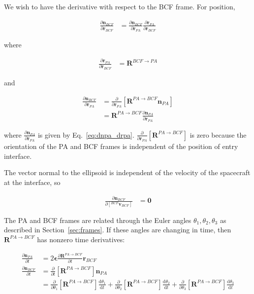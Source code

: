 \documentclass[]{article}
\newcommand{\vb}[1]{\bm{#1}} %
\newcommand{\ddt}[1]{\frac{\mathrm{d} #1}{\mathrm{d} t}} %
\newcommand{\pd}[2]{\frac{\partial #1}{\partial #2}} %
\begin{document}
We wish to have the derivative with respect to the BCF frame. For position,

\begin{align}
	\pd{\vb{n}_{BCF}}{\vb{r}_{BCF}} &= \pd{\vb{n}_{BCF}}{\vb{r}_{PA}} \pd{\vb{r}_{PA}}{\vb{r}_{BCF}}
\end{align}

where

\begin{align}
	\pd{\vb{r}_{PA}}{\vb{r}_{BCF}} &= \vb{R}^{BCF \rightarrow PA}
\end{align}

and

\begin{align}
	 \pd{\vb{n}_{BCF}}{\vb{r}_{PA}} &= \frac{\partial}{\partial \vb{r}_{PA}} \left[ \vb{R}^{PA \rightarrow BCF} \vb{n}_{PA} \right] \\
	 &= \vb{R}^{PA \rightarrow BCF} \pd{\vb{n}_{PA}}{\vb{r}_{PA}}
\end{align}

where $\pd{\vb{n}_{PA}}{\vb{r}_{PA}}$ is given by Eq.~\eqref{eq:dnpa_drpa}. $\frac{\partial}{\partial \vb{r}_{PA}} \left[ \vb{R}^{PA \rightarrow BCF} \right]$ is zero because the orientation of the PA and BCF frames is independent of the position of entry interface.

The vector normal to the ellipsoid is independent of the velocity of the spacecraft at the interface, so

\begin{align}
	\pd{\vb{n}_{BCF}}{\left[ ^{BCF} \vb{v}_{BCF} \right]} &= \vb{0}
\end{align}

The PA and BCF frames are related through the Euler angles $\theta_1, \theta_2, \theta_3$ as described in Section~\ref{sec:frames}. If these angles are changing in time, then $\vb{R}^{PA \rightarrow BCF}$ has nonzero time derivatives:

\begin{align}
	\pd{\vb{n}_{PA}}{t} &= 2 \vb{\epsilon} \pd{\vb{R}^{PA \rightarrow BCF}}{t} \vb{r}_{BCF} \\
	\pd{\vb{n}_{BCF}}{t} &= \frac{\partial}{\partial t} \left[ \vb{R}^{PA \rightarrow BCF} \right] \vb{n}_{PA} \\
	&= \frac{\partial}{\partial \theta_1} \left[ \vb{R}^{PA \rightarrow BCF} \right] \ddt{\theta_1} + \frac{\partial}{\partial \theta_2} \left[ \vb{R}^{PA \rightarrow BCF} \right] \ddt{\theta_2} + \frac{\partial}{\partial \theta_3} \left[ \vb{R}^{PA \rightarrow BCF} \right] \ddt{\theta_3}
\end{align}
\end{document}

